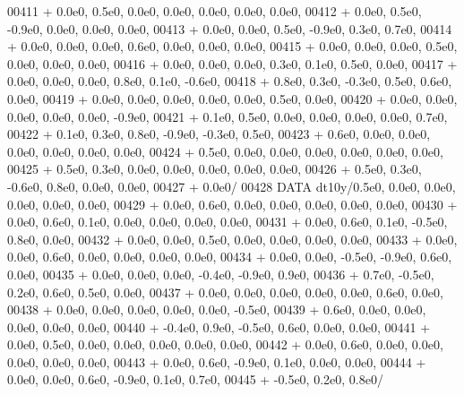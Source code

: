 \begin{DoxyCode}
00411      +                  0.0e0, 0.5e0, 0.0e0, 0.0e0, 0.0e0, 0.0e0, 0.0e0,
00412      +                  0.0e0, 0.5e0, -0.9e0, 0.0e0, 0.0e0, 0.0e0,
00413      +                  0.0e0, 0.0e0, 0.5e0, -0.9e0, 0.3e0, 0.7e0,
00414      +                  0.0e0, 0.0e0, 0.0e0, 0.6e0, 0.0e0, 0.0e0, 0.0e0,
00415      +                  0.0e0, 0.0e0, 0.0e0, 0.5e0, 0.0e0, 0.0e0, 0.0e0,
00416      +                  0.0e0, 0.0e0, 0.0e0, 0.3e0, 0.1e0, 0.5e0, 0.0e0,
00417      +                  0.0e0, 0.0e0, 0.0e0, 0.8e0, 0.1e0, -0.6e0,
00418      +                  0.8e0, 0.3e0, -0.3e0, 0.5e0, 0.6e0, 0.0e0,
00419      +                  0.0e0, 0.0e0, 0.0e0, 0.0e0, 0.0e0, 0.5e0, 0.0e0,
00420      +                  0.0e0, 0.0e0, 0.0e0, 0.0e0, 0.0e0, -0.9e0,
00421      +                  0.1e0, 0.5e0, 0.0e0, 0.0e0, 0.0e0, 0.0e0, 0.7e0,
00422      +                  0.1e0, 0.3e0, 0.8e0, -0.9e0, -0.3e0, 0.5e0,
00423      +                  0.6e0, 0.0e0, 0.0e0, 0.0e0, 0.0e0, 0.0e0, 0.0e0,
00424      +                  0.5e0, 0.0e0, 0.0e0, 0.0e0, 0.0e0, 0.0e0, 0.0e0,
00425      +                  0.5e0, 0.3e0, 0.0e0, 0.0e0, 0.0e0, 0.0e0, 0.0e0,
00426      +                  0.5e0, 0.3e0, -0.6e0, 0.8e0, 0.0e0, 0.0e0,
00427      +                  0.0e0/
00428       \textcolor{keyword}{DATA}              dt10y/0.5e0, 0.0e0, 0.0e0, 0.0e0, 0.0e0, 0.0e0,
00429      +                  0.0e0, 0.6e0, 0.0e0, 0.0e0, 0.0e0, 0.0e0, 0.0e0,
00430      +                  0.0e0, 0.6e0, 0.1e0, 0.0e0, 0.0e0, 0.0e0, 0.0e0,
00431      +                  0.0e0, 0.6e0, 0.1e0, -0.5e0, 0.8e0, 0.0e0,
00432      +                  0.0e0, 0.0e0, 0.5e0, 0.0e0, 0.0e0, 0.0e0, 0.0e0,
00433      +                  0.0e0, 0.0e0, 0.6e0, 0.0e0, 0.0e0, 0.0e0, 0.0e0,
00434      +                  0.0e0, 0.0e0, -0.5e0, -0.9e0, 0.6e0, 0.0e0,
00435      +                  0.0e0, 0.0e0, 0.0e0, -0.4e0, -0.9e0, 0.9e0,
00436      +                  0.7e0, -0.5e0, 0.2e0, 0.6e0, 0.5e0, 0.0e0,
00437      +                  0.0e0, 0.0e0, 0.0e0, 0.0e0, 0.0e0, 0.6e0, 0.0e0,
00438      +                  0.0e0, 0.0e0, 0.0e0, 0.0e0, 0.0e0, -0.5e0,
00439      +                  0.6e0, 0.0e0, 0.0e0, 0.0e0, 0.0e0, 0.0e0,
00440      +                  -0.4e0, 0.9e0, -0.5e0, 0.6e0, 0.0e0, 0.0e0,
00441      +                  0.0e0, 0.5e0, 0.0e0, 0.0e0, 0.0e0, 0.0e0, 0.0e0,
00442      +                  0.0e0, 0.6e0, 0.0e0, 0.0e0, 0.0e0, 0.0e0, 0.0e0,
00443      +                  0.0e0, 0.6e0, -0.9e0, 0.1e0, 0.0e0, 0.0e0,
00444      +                  0.0e0, 0.0e0, 0.6e0, -0.9e0, 0.1e0, 0.7e0,
00445      +                  -0.5e0, 0.2e0, 0.8e0/

\end{DoxyCode}
